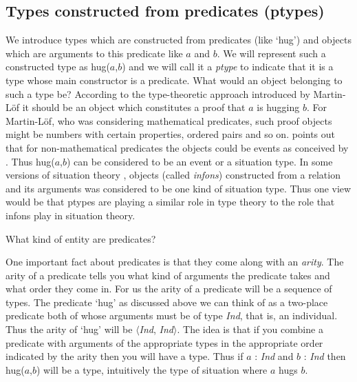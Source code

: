 \subsection{Types constructed from predicates (ptypes)}
\label{sec:ptypes}
We
introduce types which are constructed from predicates (like `hug') and
objects which are arguments to this predicate like $a$ and $b$.  We
will represent such a constructed type as hug($a$,$b$) and we will
call it a \textit{ptype} to indicate that it is a type whose
main constructor is a predicate.  What would an
object belonging to such a type be?  According to the type-theoretic
approach introduced by Martin-Löf it should be an object which
constitutes a proof that $a$ is hugging $b$.  For Martin-Löf, who was
considering mathematical predicates, such proof objects might be numbers
with certain properties, ordered pairs and so on.  \cite{Ranta1994}
points out that for non-mathematical predicates the objects could be
events as conceived by \cite{Davidson1967,Davidson1980}.  Thus hug($a$,$b$) can be
considered to be an event or a situation type.  In some versions of
situation theory \cite{Barwise1989,SeligmanMoss1997}, objects (called \textit{infons})
constructed from a relation and its arguments was considered to be one
kind of situation type.  Thus one view would be that 
ptypes are playing a similar role in type theory to the role that
infons play in situation theory.

What kind of entity are predicates?    One important fact about predicates
is that they come along with an \textit{arity}.  The arity of a
predicate tells you what kind of arguments the predicate takes and
what order they come in. For us the arity of a predicate will be a
sequence of types.  The predicate `hug' as discussed above we can
think of as a two-place predicate both of whose arguments must be of
type \textit{Ind}, that is, an individual.  Thus the arity of `hug'
will be $\langle$\textit{Ind}, \textit{Ind}$\rangle$.  The idea is
that if you combine a predicate with arguments of the appropriate
types in the appropriate order indicated by the arity then you will
have a type.  Thus if $a$ : \textit{Ind} and $b$ : \textit{Ind} then
hug($a$,$b$) will be a type, intuitively the type of situation where
$a$ hugs $b$.  


